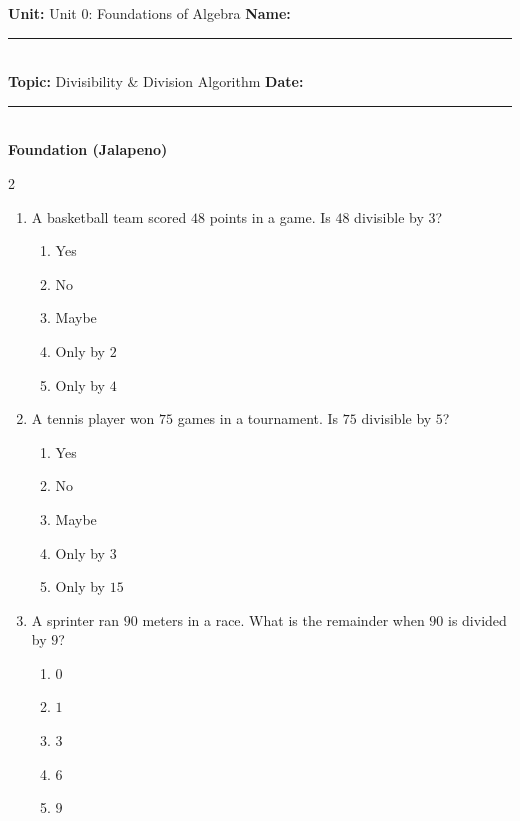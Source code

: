 \documentclass[10pt]{article}
\begin{document}
\enlargethispage{2.5cm}

\begin{tcolorbox}[colback=mainblue!5, colframe=mainblue, sharp corners, boxrule=0.5pt]
    \small \textbf{Unit:} Unit 0: Foundations of Algebra \hfill \textbf{Name:} \rule{3cm}{0.4pt} \\
    \small \textbf{Topic:} Divisibility & Division Algorithm \hfill \textbf{Date:} \rule{2cm}{0.4pt} \\
    \centering \textbf{\large Foundation (Jalapeno)}
\end{tcolorbox}

\vspace{0.2cm}

\begin{multicols}{2}
\begin{enumerate}[label=\textbf{Q\arabic*.}, leftmargin=*, itemsep=6pt, parsep=0pt]

  \item \small A basketball team scored $48$ points in a game. Is $48$ divisible by $3$?
  \begin{enumerate}[label=(\Alph*), leftmargin=0.6cm, nosep, itemsep=2pt]
    \item Yes
    \item No
    \item Maybe
    \item Only by $2$
    \item Only by $4$
  \end{enumerate}

  \item \small A tennis player won $75$ games in a tournament. Is $75$ divisible by $5$?
  \begin{enumerate}[label=(\Alph*), leftmargin=0.6cm, nosep, itemsep=2pt]
    \item Yes
    \item No
    \item Maybe
    \item Only by $3$
    \item Only by $15$
  \end{enumerate}

  \item \small A sprinter ran $90$ meters in a race. What is the remainder when $90$ is divided by $9$?
  \begin{enumerate}[label=(\Alph*), leftmargin=0.6cm, nosep, itemsep=2pt]
    \item $0$
    \item $1$
    \item $3$
    \item $6$
    \item $9$
  \end{enumerate}


\end{enumerate}
\end{multicols}
\end{document}
